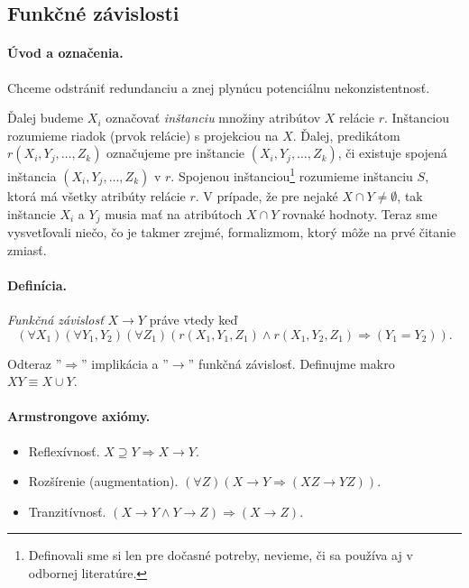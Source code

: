 \documentclass[10pt,a4paper]{article}
\begin{document}
\subsection{Funkčné závislosti}

\paragraph{Úvod a označenia.}
Chceme odstrániť redundanciu a znej plynúcu potenciálnu nekonzistentnosť. 

Ďalej budeme $X_i$ označovať \emph{inštanciu} množiny atribútov $X$ relácie $r$. 
Inštanciou rozumieme riadok (prvok relácie) s projekciou na $X$.
Ďalej, predikátom $r(X_i,Y_j, \ldots, Z_k)$ označujeme pre inštancie $(X_i,Y_j, \ldots, Z_k)$, či existuje spojená inštancia $(X_i,Y_j, \ldots, Z_k)$ v $r$.
Spojenou inštanciou\footnote{Definovali sme si len pre dočasné potreby, nevieme, či sa používa aj v odbornej literatúre.} 
rozumieme inštanciu $S$, ktorá má všetky atribúty relácie $r$. V prípade, že pre nejaké $X \cap Y \neq \emptyset$, tak inštancie $X_i$ a $Y_j$ musia mať na atribútoch $X \cap Y$ rovnaké hodnoty.  
Teraz sme vysvetľovali niečo, čo je takmer zrejmé, formalizmom, ktorý môže na prvé čitanie zmiasť. 

\paragraph{Definícia.}
\emph{Funkčná závislosť} $X \rightarrow Y$ práve vtedy keď 
$$(\forall X_1)(\forall Y_1,Y_2)(\forall Z_1) (r(X_1, Y_1, Z_1) \wedge r(X_1, Y_2, Z_1) \Rightarrow (Y_1 = Y_2)).$$

Odteraz ''$\Rightarrow$'' implikácia a ''$\rightarrow$'' funkčná závislosť.
Definujme makro $XY \equiv X \cup Y$. 

\paragraph{Armstrongove axiómy.} 
\begin{itemize}
\item Reflexívnosť. $X \supseteq Y \Rightarrow X \rightarrow Y$.
\item Rozšírenie (augmentation). $(\forall Z)(X \rightarrow Y \Rightarrow (XZ \rightarrow YZ))$.
\item Tranzitívnosť. $(X \rightarrow Y \wedge Y \rightarrow Z) \Rightarrow (X \rightarrow Z)$.
\end{itemize}
 
\end{document}
